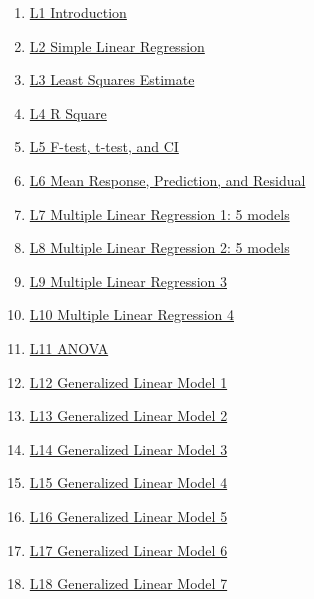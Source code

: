 \documentclass[11pt]{article}
\begin{document}
\begin{multicols}{2}
	\begin{enumerate}
		\item \href{https://mp.weixin.qq.com/s/zu2rZKl4vetkip8m6PDkXg}{L1 Introduction}	%
		\item \href{https://mp.weixin.qq.com/s/a8urgkUL3S7r8DyQHML-dw}{L2 Simple Linear Regression}	%
		\item \href{https://mp.weixin.qq.com/s/UQ-d8_wyUNcW2fEqStm29w}{L3 Least Squares Estimate}	%
		\item \href{https://mp.weixin.qq.com/s/Em5nvP4F_K1ctnZkcY6wSg}{L4 R Square}	%
		\item \href{https://mp.weixin.qq.com/s/5sTxbsfHdLNw1k11a8-2OQ}{L5 F-test, t-test, and CI}	%
		\item \href{https://mp.weixin.qq.com/s/jID32_xlslFx3cmAZxLLDQ}{L6 Mean Response, Prediction, and Residual}	%
		\item \href{https://mp.weixin.qq.com/s/zY_vg96mpC4pLbQahti9ZA}{L7 Multiple Linear Regression 1: 5 models}	%
		\item \href{https://mp.weixin.qq.com/s/J7qKWPe2-OGaEhhAzE2bjQ}{L8 Multiple Linear Regression 2: 5 models}	%
		\item \href{https://mp.weixin.qq.com/s/vSYsD8ghV660FSmq9-WGfA}{L9 Multiple Linear Regression 3}	%
		\item \href{https://mp.weixin.qq.com/s/wHFZfm5u5uo2ni7oF8r7GQ}{L10 Multiple Linear Regression 4}	%
		\item \href{https://mp.weixin.qq.com/s/4spXA_mZyHvt8IXU2XLNAg}{L11 ANOVA}	%
		\item \href{https://mp.weixin.qq.com/s/Ldefj0fXiUOtaz1022Sqew}{L12 Generalized Linear Model 1}	%
		\item \href{https://mp.weixin.qq.com/s/fvkf8diVxu0ovaVGerdV6Q}{L13 Generalized Linear Model 2}	%
		\item \href{https://mp.weixin.qq.com/s/yu6FmapfvcsBo0zeR7IyHQ}{L14 Generalized Linear Model 3}	%
		\item \href{https://mp.weixin.qq.com/s/JX29eI9ZhNl1Sw851zVDtQ}{L15 Generalized Linear Model 4}	%
		\item \href{https://mp.weixin.qq.com/s/PIn6p3GR9ivEJV9W3cx2mg}{L16 Generalized Linear Model 5}	%
		\item \href{https://mp.weixin.qq.com/s/xsYG6X17_-AYB9YmvL6uNA}{L17 Generalized Linear Model 6}	%
		\item \href{https://mp.weixin.qq.com/s/DAzii_6NPXNbI6K0cuywwg}{L18 Generalized Linear Model 7}	%

\end{enumerate}
\end{multicols}
\end{document}
